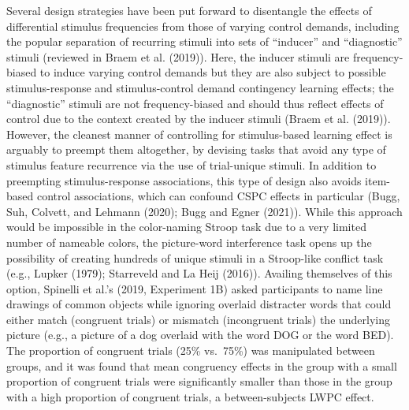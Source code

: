 \documentclass[
  ,man,floatsintext]{apa6}
\begin{document}
Several design strategies have been put forward to disentangle the effects of differential stimulus frequencies from those of varying control demands, including the popular separation of recurring stimuli into sets of ``inducer'' and ``diagnostic'' stimuli (reviewed in Braem et al. (2019)). Here, the inducer stimuli are frequency-biased to induce varying control demands but they are also subject to possible stimulus-response and stimulus-control demand contingency learning effects; the ``diagnostic'' stimuli are not frequency-biased and should thus reflect effects of control due to the context created by the inducer stimuli (Braem et al. (2019)). However, the cleanest manner of controlling for stimulus-based learning effect is arguably to preempt them altogether, by devising tasks that avoid any type of stimulus feature recurrence via the use of trial-unique stimuli. In addition to preempting stimulus-response associations, this type of design also avoids item-based control associations, which can confound CSPC effects in particular (Bugg, Suh, Colvett, and Lehmann (2020); Bugg and Egner (2021)). While this approach would be impossible in the color-naming Stroop task due to a very limited number of nameable colors, the picture-word interference task opens up the possibility of creating hundreds of unique stimuli in a Stroop-like conflict task (e.g., Lupker (1979); Starreveld and La Heij (2016)). Availing themselves of this option, Spinelli et al.'s (2019, Experiment 1B) asked participants to name line drawings of common objects while ignoring overlaid distracter words that could either match (congruent trials) or mismatch (incongruent trials) the underlying picture (e.g., a picture of a dog overlaid with the word DOG or the word BED). The proportion of congruent trials (25\% vs.~75\%) was manipulated between groups, and it was found that mean congruency effects in the group with a small proportion of congruent trials were significantly smaller than those in the group with a high proportion of congruent trials, a between-subjects LWPC effect.
\end{document}

